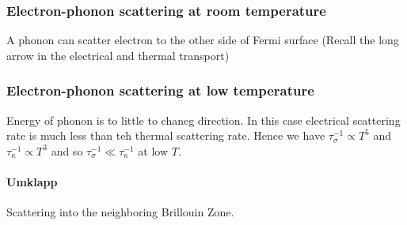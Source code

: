 \documentclass[12pt,a4paper]{article}
\begin{document}
\subsubsection{Electron-phonon scattering at room temperature}
A phonon can scatter electron to the other side of Fermi surface (Recall the long arrow in the electrical and thermal transport)
\subsubsection{Electron-phonon scattering at low temperature}
Energy of phonon is to little to chaneg direction. In this case electrical scattering rate is much less than teh thermal scattering rate.
Hence we have $\tau_\sigma^{-1} \propto T^5$ and $\tau_\kappa^{-1} \propto T^3$ and so $\tau_\sigma^{-1} \ll \tau_\kappa^{-1}$ at low $T$.
\paragraph*{Umklapp}
Scattering into the neighboring Brillouin Zone.
\end{document}
